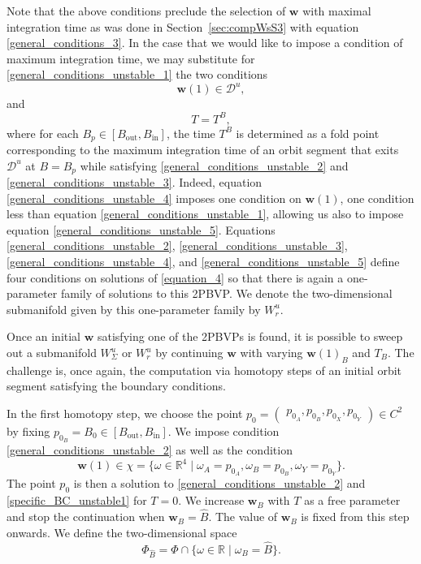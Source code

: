 \documentclass{ws-ijbc}
\begin{document}
Note that the above conditions preclude the selection of $\mathbf{w}$ with maximal integration time as was done in Section~\ref{sec:compWsS3} with equation \eqref{general_conditions_3}.  In the case that we would like to impose a condition of maximum integration time, we may substitute for \eqref{general_conditions_unstable_1} the two conditions
%
\begin{equation}
	\mathbf{w}(1) \in \mathscr{D}^u,
	\label{general_conditions_unstable_4}
\end{equation}
%
and
%
\begin{equation}
	T = T^B,
	\label{general_conditions_unstable_5}
\end{equation}
%
where for each $B_p \in [B_{\text{out}}, B_{\text{in}}]$, the time $T^B$ is determined as a fold point corresponding to the maximum integration time of an orbit segment that exits $\mathscr{D}^u$ at $B = B_p$ while satisfying \eqref{general_conditions_unstable_2} and \eqref{general_conditions_unstable_3}.  Indeed, equation \eqref{general_conditions_unstable_4} imposes one condition on $\mathbf{w}(1)$, one condition less than equation \eqref{general_conditions_unstable_1}, allowing us also to impose equation \eqref{general_conditions_unstable_5}.  Equations \eqref{general_conditions_unstable_2}, \eqref{general_conditions_unstable_3}, \eqref{general_conditions_unstable_4}, and \eqref{general_conditions_unstable_5} define four conditions on solutions of \eqref{equation_4} so that there is again a one-parameter family of solutions to this 2PBVP.  We denote the two-dimensional submanifold given by this one-parameter family by $W^u_r$.

Once an initial $\mathbf{w}$ satisfying one of the 2PBVPs  is found, it is possible to sweep out a submanifold $W^u_\Sigma$ or $W^u_r$ by continuing $\mathbf{w}$ with varying $\mathbf{w}(1)_B$ and $T_B$.  The challenge is, once again, the computation via homotopy steps of an initial orbit segment satisfying the boundary conditions.

In the first homotopy step, we choose the point $p_0=\begin{pmatrix} p_{0_A}, p_{0_B}, p_{0_X}, p_{0_Y} \end{pmatrix} \in C^2$ by fixing $p_{0_B}=B_0 \in [B_{\text{out}}, B_{\text{in}}]$.  We impose condition \eqref{general_conditions_unstable_2} as well as the condition
%
\begin{equation}
		\mathbf{w}(1) \in \chi = \{ \omega \in \mathbb{R}^4 \; | \; \omega_A=p_{0_A}, \omega_B=p_{0_B}, \omega_Y=p_{0_Y} \}.
		\label{specific_BC_unstable1}
\end{equation}
%
The point $p_0$ is then a solution to \eqref{general_conditions_unstable_2} and \eqref{specific_BC_unstable1} for $T=0$.  We increase $\mathbf{w}_B$ with $T$ as a free parameter and stop the continuation when $\mathbf{w}_B=\widehat{B}$.  The value of $\mathbf{w}_B$ is fixed from this step onwards.  We define the two-dimensional space
%
\begin{equation*}
	\Phi_{\widehat{B}} = \Phi \cap \{ \omega \in \mathbb{R} \; | \; \omega_B=\widehat{B}\}.
\end{equation*}
\end{document}
